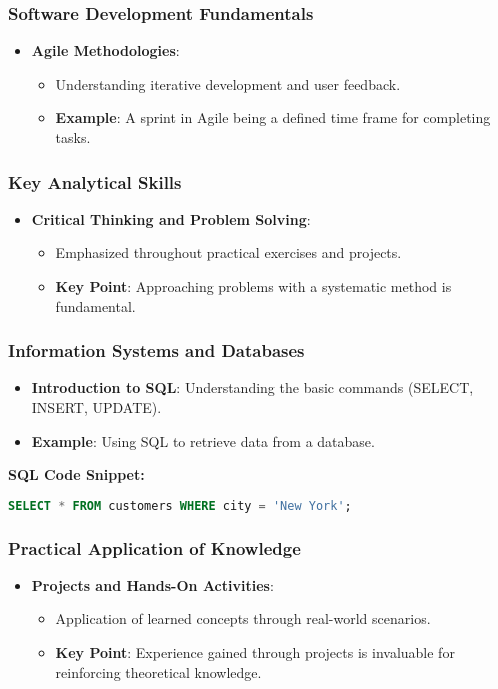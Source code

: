 \documentclass[aspectratio=169]{beamer}
\begin{document}
\begin{frame}
    \frametitle{Software Development Fundamentals}
    \begin{itemize}
        \item \textbf{Agile Methodologies}:
        \begin{itemize}
            \item Understanding iterative development and user feedback.
            \item \textbf{Example}: A sprint in Agile being a defined time frame for completing tasks.
        \end{itemize}
    \end{itemize}
\end{frame}

\begin{frame}
    \frametitle{Key Analytical Skills}
    \begin{itemize}
        \item \textbf{Critical Thinking and Problem Solving}:
        \begin{itemize}
            \item Emphasized throughout practical exercises and projects.
            \item \textbf{Key Point}: Approaching problems with a systematic method is fundamental.
        \end{itemize}
    \end{itemize}
\end{frame}

\begin{frame}[fragile]
    \frametitle{Information Systems and Databases}
    \begin{itemize}
        \item \textbf{Introduction to SQL}: Understanding the basic commands (SELECT, INSERT, UPDATE).
        \item \textbf{Example}: Using SQL to retrieve data from a database.
    \end{itemize}
    
    \textbf{SQL Code Snippet:}
    \begin{lstlisting}[language=SQL]
    SELECT * FROM customers WHERE city = 'New York';
    \end{lstlisting}
\end{frame}

\begin{frame}
    \frametitle{Practical Application of Knowledge}
    \begin{itemize}
        \item \textbf{Projects and Hands-On Activities}:
        \begin{itemize}
            \item Application of learned concepts through real-world scenarios.
            \item \textbf{Key Point}: Experience gained through projects is invaluable for reinforcing theoretical knowledge.
        \end{itemize}
    \end{itemize}
\end{frame}
\end{document}
